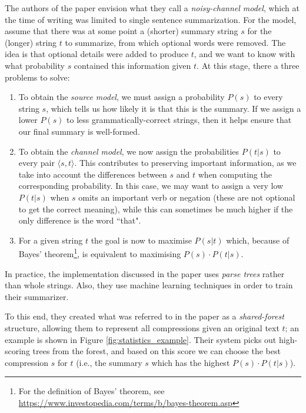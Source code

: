 The authors of the paper \cite{knight_statistics-based_2000} envision what they call a \textit{noisy-channel model}, which at the time of writing was limited to single sentence summarization. For the  model, assume that there was at some point a (shorter) summary string $s$ for the (longer) string $t$ to summarize, from which optional words were removed. The idea is that optional details were added to produce $t$, and we want to know with what probability $s$ contained this information given $t$. At this stage, there a three problems to solve:
\begin{enumerate}[noitemsep]
\item To obtain the \textit{source model}, we must assign a probability $P(s)$ to every string $s$, which tells us how likely it is that this is the summary. If we assign a lower $P(s)$ to less grammatically-correct strings, then it helps ensure that our final summary is well-formed.
\item To obtain the \textit{channel model}, we now assign the probabilities $P(t \vert s)$ to every pair $\langle s, t \rangle$. This contributes to preserving important information, as we take into account the differences between $s$ and $t$ when computing the corresponding probability. In this case, we may want to assign a very low $P(t \vert s)$ when $s$ omits an important verb or negation (these are not optional to get the correct meaning), while this can sometimes be much higher if the only difference is the word ``that".
\item For a given string $t$ the goal is now to maximise $P(s \vert t)$ which, because of Bayes' theorem\footnote{For the definition of Bayes' theorem, see \url{https://www.investopedia.com/terms/b/bayes-theorem.asp}}, is equivalent to maximising $P(s) \cdot P(t \vert s)$.
\end{enumerate}

\noindent
In practice, the implementation discussed in the paper uses \textit{parse trees} rather than whole strings. Also, they use machine learning techniques in order to train their summarizer.

To this end, they created what was referred to in the paper as a \textit{shared-forest} structure, allowing them to represent all compressions given an original text $t$; an example is shown in Figure \ref{fig:statistics_example}. Their system picks out high-scoring trees from the forest, and based on this score we can choose the best compression $s$ for $t$ (i.e., the summary $s$ which has the highest $P(s) \cdot P(t \vert s)$).

